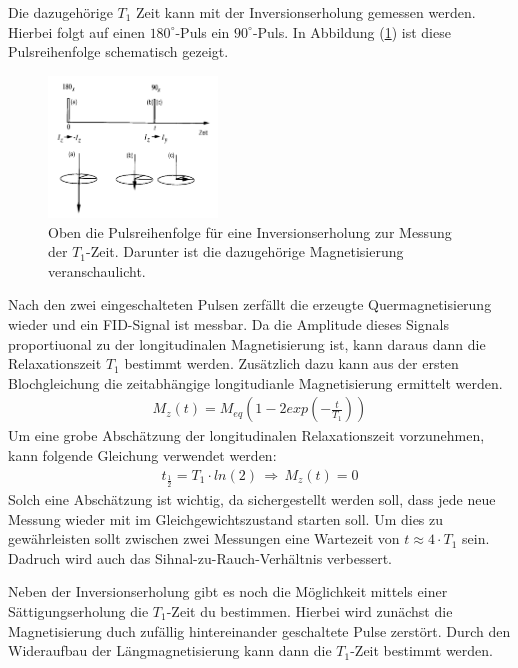 Die dazugeh\"{o}rige $T_1$ Zeit kann mit der Inversionserholung gemessen werden.
Hierbei folgt auf einen $180^{\circ}$-Puls ein $90^{\circ}$-Puls.
In Abbildung (\ref{inversion}) ist diese Pulsreihenfolge schematisch gezeigt.
\begin{figure}
	\centering
	\includegraphics[width=0.4\textwidth]{Plots/inversionserholung.png}
	\caption{Oben die Pulsreihenfolge f\"{u}r eine Inversionserholung zur Messung der $T_1$-Zeit. Darunter ist die dazugeh\"{o}rige Magnetisierung veranschaulicht.}
	\label{inversion}
\end{figure}
Nach den zwei eingeschalteten Pulsen zerf\"{a}llt die erzeugte Quer{\-}mag{\-}ne{\-}ti{\-}sie{\-}rung wieder und ein FID-Signal ist messbar.
Da die Amplitude dieses Signals proportiuonal zu der longitudinalen Magnetisierung ist, kann daraus dann die Relaxationszeit $T_1$ bestimmt werden.
Zus\"{a}tzlich dazu kann aus der ersten Blochgleichung die zeitabh\"{a}ngige longitudianle Magnetisierung ermittelt werden.
\begin{align*}
	M_z(t) = M_{eq} \left(1 - 2 exp\left( - \frac{t}{T_1} \right) \right)
\end{align*}
Um eine grobe Absch\"{a}tzung der longitudinalen Relaxationszeit vorzunehmen, kann folgende Gleichung verwendet werden:
\begin{align*}
	t_{\frac{1}{2}} = T_1 \cdot ln(2) \, \Rightarrow \, M_z(t) = 0
\end{align*}
Solch eine Absch\"{a}tzung ist wichtig, da sichergestellt werden soll, dass jede neue Messung wieder mit im Gleichgewichtszustand starten soll.
Um dies zu gew\"{a}hrleisten sollt zwischen zwei Messungen eine Wartezeit von $t \approx 4 \cdot T_1$ sein.
Dadruch wird auch das Sihnal-zu-Rauch-Verh\"{a}ltnis verbessert.

Neben der Inversionserholung gibt es noch die M\"{o}glichkeit mittels einer S\"{a}ttigungs{\-}erhol{\-}ung die $T_1$-Zeit du bestimmen.
Hierbei wird zun\"{a}chst die Magnetisierung duch zuf\"{a}llig hintereinander geschaltete Pulse zerst\"{o}rt.
Durch den Wideraufbau der L\"{a}ngmagnetisierung kann dann die $T_1$-Zeit bestimmt werden.

